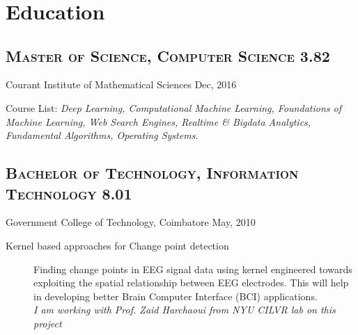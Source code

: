 \documentclass{resume}
\begin{document}
\\

\\
\\
\section{Education}
\subsection[Master of Science, Computer Science]{\textsc{Master of Science, Computer Science} \hfill \textbf{3.82}}%
\small{Courant Institute of Mathematical Sciences} \hfill \small{Dec, 2016}
  \begin{description}
    \item{Course List:} \small{\textit{Deep Learning, Computational Machine Learning, Foundations of Machine Learning, Web Search Engines, Realtime \& Bigdata Analytics, Fundamental Algorithms, Operating Systems.}}
  \end{description}
\subsection[Bachelor of Technology, Information Technology]{\textsc{Bachelor of Technology, Information Technology} \hfill \textbf{8.01}}%
\small{Government College of Technology, Coimbatore} \hfill \small{May, 2010}

  \begin{description}
    \item[Kernel based approaches for Change point detection]  Finding change points in EEG signal data using kernel engineered towards exploiting the spatial relationship between EEG electrodes.  This will help in developing better Brain Computer Interface (BCI) applications.\\
      \textit{I am working with Prof\@. Zaid Harchaoui from NYU CILVR lab on this project}
  \end{description}
\end{document}
